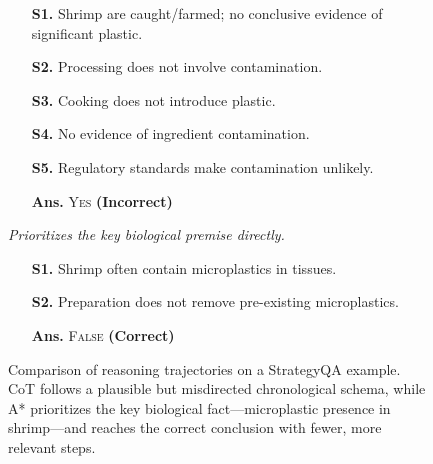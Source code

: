 \documentclass{article}
\begin{document}
\begin{figure}[t]
\begin{tcolorbox}
\begin{minipage}[t]{0.485\textwidth}
\begin{tcolorbox}
\vspace{2pt}
\begin{itemize}
    \setlength{\itemsep}{1pt}
    \setlength{\parskip}{0pt}
    \item[\textbf{S1.}] Shrimp are caught/farmed; no conclusive evidence of significant plastic.
    \item[\textbf{S2.}] Processing does not involve contamination.
    \item[\textbf{S3.}] Cooking does not introduce plastic.
    \item[\textbf{S4.}] No evidence of ingredient contamination.
    \item[\textbf{S5.}] Regulatory standards make contamination unlikely.
    \item[\textbf{Ans.}] \textsc{Yes} \hfill \textbf{(Incorrect)}
\end{itemize}
\end{tcolorbox}
\end{minipage}
\hfill
\begin{minipage}[t]{0.485\textwidth}
\begin{tcolorbox}[
    enhanced,
    colback=blue!2,
    colframe=blue!65!black,
    boxrule=0.5pt,
    arc=1.2mm,
    left=5pt, right=5pt, top=4pt, bottom=4pt,
    title=\textbf{\color{blue!75!black}\ding{51} A* Search}\hfill \emph{Heuristic-guided},
    colbacktitle=blue!6,
    coltitle=black,
    fonttitle=\footnotesize
]
\textit{Prioritizes the key biological premise directly.}

\vspace{2pt}
\begin{itemize}
    \setlength{\itemsep}{1pt}
    \setlength{\parskip}{0pt}
    \item[\textbf{S1.}] Shrimp often contain microplastics in tissues.
    \item[\textbf{S2.}] Preparation does not remove pre-existing microplastics.
    \item[\textbf{Ans.}] \textsc{False} \hfill \textbf{(Correct)}
\end{itemize}
\end{tcolorbox}
\end{minipage}

\end{tcolorbox}

\vspace{-2mm}
\caption{Comparison of reasoning trajectories on a StrategyQA example. CoT follows a plausible but misdirected chronological schema, while A* prioritizes the key biological fact—microplastic presence in shrimp—and reaches the correct conclusion with fewer, more relevant steps.}
\label{fig:motivating_example}
\end{figure}
\end{document}
